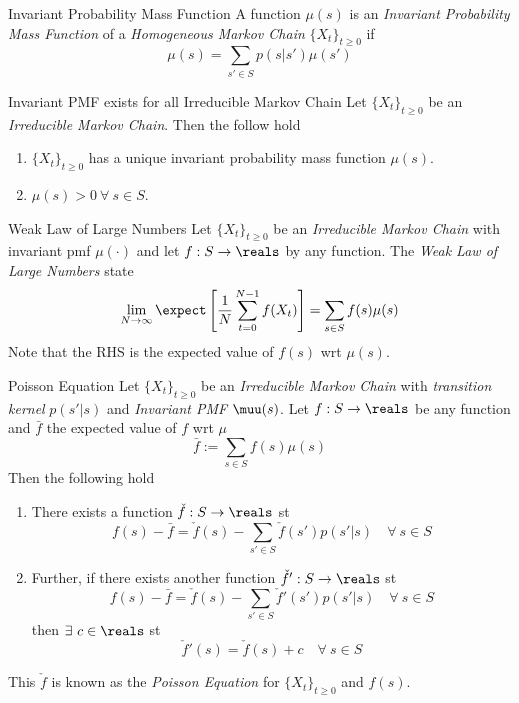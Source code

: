 \documentclass[11pt,a4paper]{article}
\begin{document}
  \begin{definition}{Invariant Probability Mass Function}
    A function $\mu(s)$ is an \textit{Invariant Probability Mass Function} of a \textit{Homogeneous Markov Chain} $\{X_t\}_{t\geq0}$ if
    \[ \mu(s)=\sum_{s'\in S}p(s|s')\mu(s') \]
  \end{definition}

  \begin{theorem}{Invariant PMF exists for all Irreducible Markov Chain}
    Let $\{X_t\}_{t\geq0}$ be an \textit{Irreducible Markov Chain}. Then the follow hold
    \begin{enumerate}
      \item $\{X_t\}_{t\geq0}$ has a unique invariant probability mass function $\mu(s)$.
      \item $\mu(s)>0\ \forall\ s\in S$.
    \end{enumerate}
  \end{theorem}

  \begin{theorem}{Weak Law of Large Numbers}
    Let $\{X_t\}_{t\geq0}$ be an \textit{Irreducible Markov Chain} with invariant pmf $\mu(\cdot)$ and let $f:S\to\reals$ by any function. The \textit{Weak Law of Large Numbers} state
    \[ \lim_{N\to\infty}\expect\left[\frac1N\sum_{t=0}^{N-1}f(X_t)\right]=\sum_{s\in S}f(s)\mu(s) \]
    Note that the RHS is the expected value of $f(s)$ wrt $\mu(s)$.
  \end{theorem}

  \begin{theorem}{Poisson Equation}
    Let $\{X_t\}_{t\geq0}$ be an \textit{Irreducible Markov Chain} with \textit{transition kernel} $p(s'|s)$ and \textit{Invariant PMF} $\muu(s)$. Let $f:S\to\reals$ be any function and $\bar{f}$ the expected value of $f$ wrt $\mu$
    \[ \bar{f}:=\sum_{s\in S}f(s)\mu(s) \]
    Then the following hold
    \begin{enumerate}
      \item There exists a function $\check{f}:S\to\reals$ st
      \[ f(s)-\bar{f}=\check{f}(s)-\sum_{s'\in S}\check{f}(s')p(s'|s)\quad\forall\ s\in S \]
      \item Further, if there exists another function $\check{f}':S\to\reals$ st
      \[ f(s)-\bar{f}=\check{f}(s)-\sum_{s'\in S}\check{f}'(s')p(s'|s)\quad\forall\ s\in S \]
      then $\exists\ c\in\reals$ st
      \[ \check{f}'(s)=\check{f}(s)+c\quad\forall\ s\in S \]
    \end{enumerate}
    This $\check{f}$ is known as the \textit{Poisson Equation} for $\{X_t\}_{t\geq0}$ and $f(s)$.
  \end{theorem}
\end{document}
